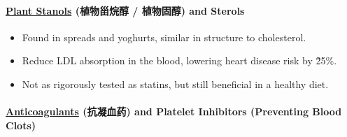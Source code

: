 \paragraph{\underline{Plant Stanols} (植物甾烷醇 / 植物固醇) and Sterols}
\begin{itemize}
    \item Found in spreads and yoghurts, similar in structure to cholesterol.
    \item Reduce LDL absorption in the blood, lowering heart disease risk by \~25\%.
    \item Not as rigorously tested as statins, but still beneficial in a healthy diet.
\end{itemize}

\paragraph{\underline{Anticoagulants} (抗凝血药) and Platelet Inhibitors (Preventing Blood Clots)}
